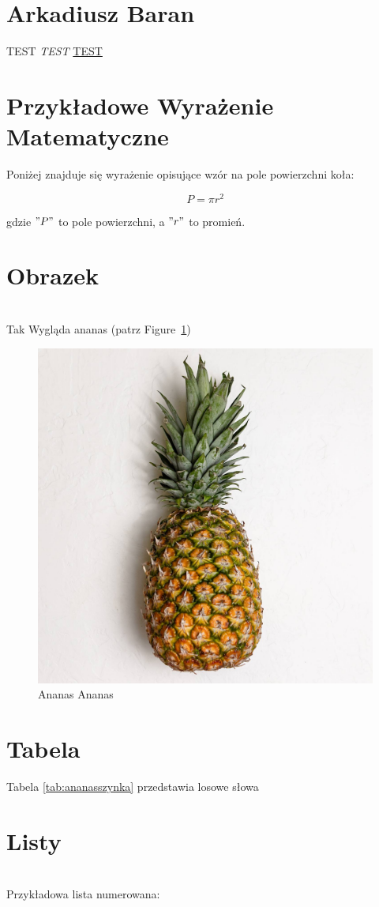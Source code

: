 \section{Arkadiusz Baran}
TEST \emph{TEST} \underline{TEST} 
\section*{Przykładowe Wyrażenie Matematyczne}
Poniżej znajduje się wyrażenie opisujące wzór na pole powierzchni koła:

\begin{equation}
P = \pi r^2
\end{equation}

gdzie \( "P" \) to pole powierzchni, a \( "r" \) to promień.

\section*{Obrazek}

\noindent 
\\Tak Wygląda ananas (patrz Figure~\ref{fig:ananas})

\begin{figure}[htbp]
    \centering 
    \includegraphics[width=0.5\linewidth]{pictures/ananas.jpg}
    \caption{Ananas Ananas}
    \label{fig:ananas}
\end{figure}

\noindent

\section*{Tabela}

Tabela \ref{tab:ananasszynka} przedstawia losowe słowa 



\section*{Listy}
\noindent
\\Przykładowa lista numerowana:

